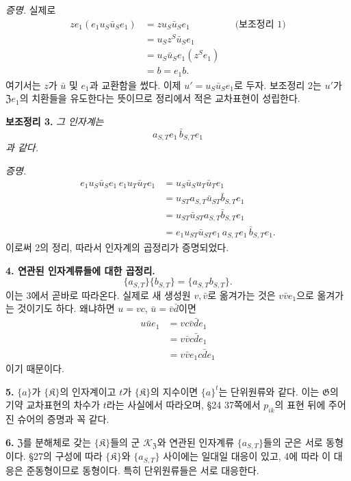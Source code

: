 \noindent\emph{증명.} 실제로
\[
\begin{aligned}
ze_1(e_1u_S\bar u_Se_1)
 &=zu_S\bar u_Se_1
      &&\text{(보조정리 1)}\\
 &=u_Sz^S\bar u_Se_1\\
 &=u_S\bar u_Se_1(z^Se_1)\\
 &=b=e_1b.
\end{aligned}
\]
여기서는 \(z\)가 \(\bar u\) 및 \(e_1\)과 교환함을 썼다. 이제 \(u'=u_S\bar u_Se_1\)로 두자. 보조정리 2는 \(u'\)가 \(\mathfrak Ze_1\)의 치환들을 유도한다는 뜻이므로 정리에서 적은 교차표현이 성립한다.

\noindent\textbf{보조정리 3.} \emph{그 인자계는}
\[
        a_{S,T}e_1\,\bar b_{S,T}e_1
\]
\emph{과 같다.}

\noindent\emph{증명.}
\[
\begin{aligned}
e_1u_S\bar u_Se_1\,
e_1u_T\bar u_Te_1
 &=u_S\bar u_Su_T\bar u_Te_1\\
 &=u_{ST}a_{S,T}\bar u_{ST}\bar b_{S,T}e_1\\
 &=u_{ST}\bar u_{ST}a_{S,T}\bar b_{S,T}e_1\\
 &=e_1u_{ST}\bar u_{ST}e_1\,
   a_{S,T}e_1\,\bar b_{S,T}e_1.
\end{aligned}
\]
이로써 2의 정리, 따라서 인자계의 곱정리가 증명되었다.

\noindent\textbf{4. 연관된 인자계류들에 대한 곱정리.}
\[
        \{a_{S,T}\}\{b_{S,T}\}
        =\{a_{S,T}b_{S,T}\}.
\]
이는 3에서 곧바로 따라온다. 실제로 새 생성원 \(v,\bar v\)로 옮겨가는 것은 \(v\bar ve_1\)으로 옮겨가는 것이기도 하다. 왜냐하면 \(u=vc\), \(\bar u=\bar v\bar d\)이면
\[
\begin{aligned}
u\bar ue_1
 &=vc\bar v\bar de_1\\
 &=v\bar v c\bar de_1\\
 &=v\bar ve_1 c\bar de_1
\end{aligned}
\]
이기 때문이다.

\noindent\textbf{5.} \(\{a\}\)가 \(\{\mathfrak K\}\)의 인자계이고 \(t\)가 \(\{\mathfrak K\}\)의 지수이면 \(\{a\}^t\)는 단위원류와 같다. 이는 \(\mathfrak G\)의 기약 교차표현의 차수가 \(t\)라는 사실에서 따라오며, §24 37쪽에서 \(p_{ik}\)의 표현 뒤에 주어진 슈어의 증명과 꼭 같다.

\noindent\textbf{6.} \(\mathfrak Z\)를 분해체로 갖는 \(\{\mathfrak K\}\)들의 군 \(\mathscr K_{\mathfrak Z}\)와 연관된 인자계류 \(\{a_{S,T}\}\)들의 군은 서로 동형이다. §27의 구성에 따라 \(\{\mathfrak K\}\)와 \(\{a_{S,T}\}\) 사이에는 일대일 대응이 있고, 4에 따라 이 대응은 준동형이므로 동형이다. 특히 단위원류들은 서로 대응한다.

